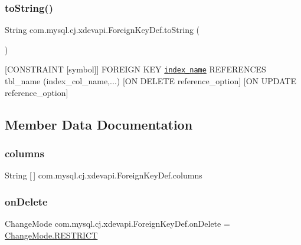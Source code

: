 \subsubsection{\texorpdfstring{to\+String()}{toString()}}
{\footnotesize\ttfamily String com.\+mysql.\+cj.\+xdevapi.\+Foreign\+Key\+Def.\+to\+String (\begin{DoxyParamCaption}{ }\end{DoxyParamCaption})}

\mbox{[}C\+O\+N\+S\+T\+R\+A\+I\+NT \mbox{[}symbol\mbox{]}\mbox{]} F\+O\+R\+E\+I\+GN K\+EY \href{index_col_name, ...}{\tt index\+\_\+name} R\+E\+F\+E\+R\+E\+N\+C\+ES tbl\+\_\+name (index\+\_\+col\+\_\+name,...) \mbox{[}ON D\+E\+L\+E\+TE reference\+\_\+option\mbox{]} \mbox{[}ON U\+P\+D\+A\+TE reference\+\_\+option\mbox{]} 

\subsection{Member Data Documentation}
\mbox{\label{classcom_1_1mysql_1_1cj_1_1xdevapi_1_1_foreign_key_def_a3ab686e302bc007e1e47bbabcbef2988}} 
\subsubsection{\texorpdfstring{columns}{columns}}
{\footnotesize\ttfamily String \mbox{[}$\,$\mbox{]} com.\+mysql.\+cj.\+xdevapi.\+Foreign\+Key\+Def.\+columns\hspace{0.3cm}{\ttfamily [protected]}}

\mbox{\label{classcom_1_1mysql_1_1cj_1_1xdevapi_1_1_foreign_key_def_acc7698fbffc9cfbc61a691f3100d6757}} 
\subsubsection{\texorpdfstring{on\+Delete}{onDelete}}
{\footnotesize\ttfamily Change\+Mode com.\+mysql.\+cj.\+xdevapi.\+Foreign\+Key\+Def.\+on\+Delete = \mbox{\hyperlink{enumcom_1_1mysql_1_1cj_1_1xdevapi_1_1_foreign_key_definition_1_1_change_mode_a652113557f37d85e0f6ad8c4c83bf864}{Change\+Mode.\+R\+E\+S\+T\+R\+I\+CT}}\hspace{0.3cm}{\ttfamily [protected]}}

